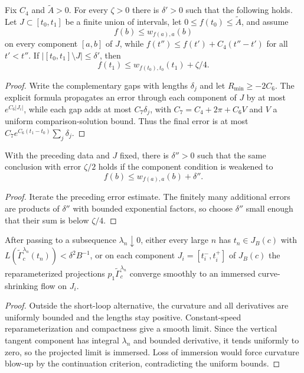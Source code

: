 \begin{claim}
\label{claim:piecewise-domination-estimate}
\label{C1C4delta}

Fix $C_4$ and $\widetilde A>0$. For every $\zeta>0$ there is $\delta'>0$ such
that the following holds. Let $J\subset[t_0,t_1]$ be a finite union of
intervals, let $0\le f(t_0)\le\widetilde A$, and assume
\[
f(b)\le w_{f(a),a}(b)
\]
on every component $[a,b]$ of $J$, while
$f(t'')\le f(t')+C_4(t''-t')$ for all $t'<t''$. If
$|[t_0,t_1]\setminus J|\le\delta'$, then
\[
f(t_1)\le w_{f(t_0),t_0}(t_1)+\zeta/4.
\]
\end{claim}
\begin{proof}
\sketch Write the complementary gaps with lengths $\delta_j$ and let
$R_{\min}\ge-2C_6$. The explicit formula propagates an error through each
component of $J$ by at most $e^{C_6|J_i|}$, while each gap adds at most
$C_7\delta_j$, with $C_7=C_4+2\pi+C_6V$ and $V$ a uniform comparison-solution
bound. Thus the final error is at most
$C_7e^{C_6(t_1-t_0)}\sum_j\delta_j$.
\end{proof}

\begin{claim}
\label{claim:approximate-piecewise-domination-estimate}
\label{deltaprime}

With the preceding data and $J$ fixed, there is $\delta''>0$ such that the
same conclusion with error $\zeta/2$ holds if the component condition is
weakened to
\[
f(b)\le w_{f(a),a}(b)+\delta''.
\]
\end{claim}
\begin{proof}
\sketch Iterate the preceding error estimate. The finitely many additional errors are
products of $\delta''$ with bounded exponential factors, so choose
$\delta''$ small enough that their sum is below $\zeta/4$.
\end{proof}

\begin{claim}
\label{claim:curve-shrinking-flow-limit}
\label{limitcs}
After passing to a subsequence $\lambda_n\downarrow0$, either every large $n$
has $t_n\in J_B(c)$ with
$L(\widetilde\Gamma_c^{\lambda_n}(t_n))<\delta^2B^{-1}$, or on each component
$J_i=[t_i^-,t_i^+]$ of $J_B(c)$ the reparameterized projections
$p_1\widetilde\Gamma_c^{\lambda_n}$ converge smoothly to an immersed
curve-shrinking flow on $J_i$.
\end{claim}
\begin{proof}
\sketch Outside the short-loop alternative, the curvature and all derivatives are
uniformly bounded and the lengths stay positive. Constant-speed
reparameterization and compactness give a smooth limit. Since the vertical
tangent component has integral $\lambda_n$ and bounded derivative, it tends
uniformly to zero, so the projected limit is immersed. Loss of immersion would
force curvature blow-up by the continuation criterion, contradicting the
uniform bounds.
\end{proof}


